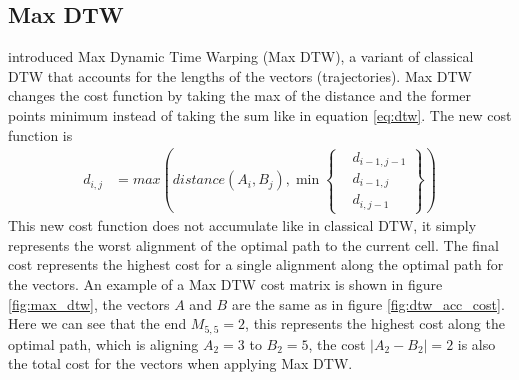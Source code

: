 \subsection{Max DTW}
\textcite{zhao2018rest} introduced Max Dynamic Time Warping (Max DTW), a variant of classical DTW that accounts for the lengths of the vectors (trajectories). Max DTW changes the cost function by taking the max of the distance and the former points minimum instead of taking the sum like in equation \ref{eq:dtw}. The new cost function is
\begin{equation}
    \label{eq:max_dtw}
    \begin{aligned}
        d_{i, j} & = max(distance(A_{i}, B_{j}), \min \left\{ \begin{aligned}
                                                                   & d_{i-1, j-1} \\
                                                                   & d_{i-1, j}   \\
                                                                   & d_{i, j-1}
                                                              \end{aligned} \right\})
    \end{aligned}
\end{equation}
This new cost function does not accumulate like in classical DTW, it simply represents the worst alignment of the optimal path to the current cell. The final cost represents the highest cost for a single alignment along the optimal path for the vectors. An example of a Max DTW cost matrix is shown in figure \ref{fig:max_dtw}, the vectors $A$ and $B$ are the same as in figure \ref{fig:dtw_acc_cost}. Here we can see that the end $M_{5,5} = 2$, this represents the highest cost along the optimal path, which is aligning $A_2 = 3$ to $B_2 = 5$, the cost $|A_2 - B_2| = 2$ is also the total cost for the vectors when applying Max DTW.
